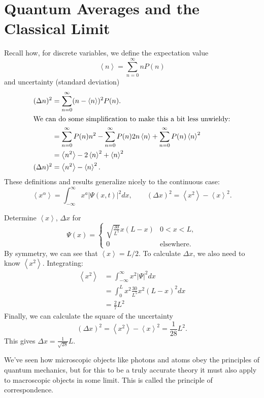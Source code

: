 \documentclass[../p052main.tex]{subfiles}
\begin{document}
\section{Quantum Averages and the Classical Limit}
Recall how, for discrete variables, we define the expectation value
\[ \left< n \right> = \sum_{n=0}^{\infty} nP(n) \]
and uncertainty (standard deviation)
\begin{align*}
    (\Delta n)^2 &= \sum_{n=0}^{\infty} (n - \left< n \right>)^2P(n). \\
    \intertext{We can do some simplification to make this a bit less unwieldy:}
    &= \sum_{n=0}^{\infty} P(n) n^2 - \sum_{n=0}^{\infty} P(n) 2n\left< n \right> + \sum_{n=0}^{\infty}P(n) \left< n \right>^2 \\
    &= \left< n^2 \right> - 2\left< n \right>^2 + \left< n \right>^2 \\
    (\Delta n)^2 &= \left< n^2 \right> - \left< n \right>^2.
\end{align*}
These definitions and results generalize nicely to the continuous case:
\[ \left< x^{\alpha} \right> = \int_{-\infty}^{\infty} x^{a} |\Psi(x,t)|^2 dx, \qquad (\Delta x)^2 = \left< x^2 \right> - \left< x \right>^2. \]

\begin{example}
    Determine $\left< x \right>$, $\Delta x$ for
    \[ \Psi(x) = \begin{cases} \sqrt{\frac{30}{L^{5}}} x (L - x) & 0 < x < L, \\ 0 & \text{elsewhere}. \end{cases} \]
    By symmetry, we can see that $\left< x \right> = L/2$.
    To calculate $\Delta x$, we also need to know $\left< x^2 \right>$.
    Integrating:
    \begin{align*}
        \left< x^2 \right> &= \int_{-\infty}^{\infty} x^2 |\Psi|^2dx \\
        &= \int_{0}^{L}x^2 \frac{30}{L^{5}} x^2 (L - x)^2 dx \\
        &= \frac{2}{7}L^2
    \end{align*}
    Finally, we can calculate the square of the uncertainty
    \[ (\Delta x)^2 = \left< x^2 \right> - \left< x \right>^2 = \frac{1}{28}L^2. \]
    This gives $\Delta x = \frac{1}{\sqrt{28}}L$.
\end{example}

We've seen how microscopic objects like photons and atoms obey the principles of quantum mechanics, but for this to be a truly accurate theory it must also apply to macroscopic objects in some limit.
This is called the principle of correspondence.
\end{document}

